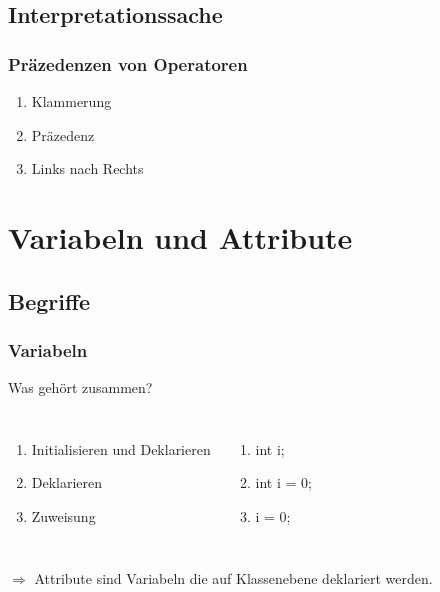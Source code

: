 \documentclass[18pt]{beamer}
\begin{document}
\subsection{Interpretationssache}
\begin{frame}
	\frametitle{Präzedenzen von Operatoren}
	\begin{enumerate}
		\item Klammerung \pause
		\item Präzedenz	\pause
		\item Links nach Rechts
	\end{enumerate}
	
\end{frame}



\section{Variabeln und Attribute}
\subsection{Begriffe}
\begin{frame}
	\frametitle{Variabeln}
	Was gehört zusammen?
	
	
	\begin{columns}[c]
		\column[c]{5cm}
			\begin{enumerate}
				\item Initialisieren und Deklarieren
				\item Deklarieren
				\item Zuweisung
			\end{enumerate}
		\column{5cm}
			\begin{enumerate}
				\item int i;
				\item int i = 0;
				\item i = 0;
			\end{enumerate}
	\end{columns}
	
	
	\pause
	$\Rightarrow$ Attribute sind Variabeln die auf Klassenebene deklariert werden.
\end{frame}

\end{document}
